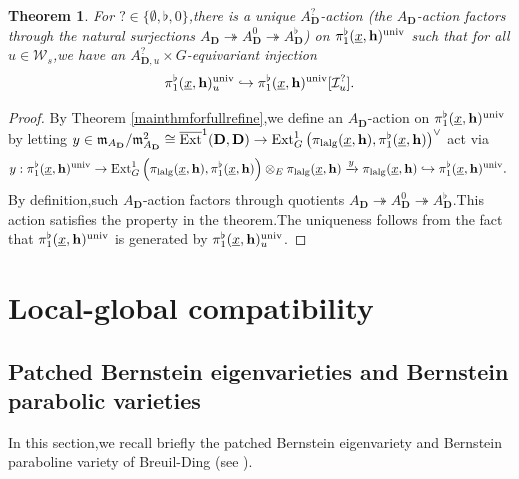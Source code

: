 \documentclass[10pt]{article}
\newtheorem{thm}{Theorem}[section]
\newcommand{\ext}{{\rm Ext}}
\newcommand{\lalg}{{\rm lalg}}
\newcommand{\Dpik}{{\mathbf{D}}}
\newcommand{\univ}{{\rm univ}}
\newcommand{\bh}{{\mathbf{h}}}
\newcommand{\cI}{\mathcal I}
\newcommand{\fm}{{\mathfrak{m}}}
\newcommand{\sW}{\mathscr W}
\begin{document}
\begin{thm}\label{actionADonuniversal}
For $?\in\{\emptyset,\flat,0\}$,\;there is a unique $A^{?}_{\Dpik}$-action (the $A_{\Dpik}$-action factors through the natural surjections $A_{\Dpik}\twoheadrightarrow  A^0_{\Dpik}\twoheadrightarrow  A^{\flat}_{\Dpik}$) on $\pi^{\flat}_{1}(\underline{x},\bh)^{\univ}$ such that for all $u\in \sW_s$,\;we have an $A^{?}_{\Dpik,u}\times G$-equivariant injection
	\[\pi^{\flat}_{1}(\underline{x},\bh)_u^{\univ}\hookrightarrow \pi^{\flat}_{1}(\underline{x},\bh)^{\univ}[\cI^{?
	}_u].\]
\end{thm}
\begin{proof}
	By Theorem \ref{mainthmforfullrefine},\;we define an $A_{\Dpik}$-action on $\pi^{\flat}_{1}(\underline{x},\bh)^{\univ}$ by letting $y\in \fm_{A_{\Dpik}}/\fm^2_{A_{\Dpik}}\cong \overline{\ext}^1(\Dpik,\Dpik)\rightarrow \ext^1_{G}\left(\pi_{\lalg}(\underline{x},\bh),\pi^{\flat}_1(\underline{x},\bh)\right)^{\vee}$ act via
	\[y:\pi^{\flat}_{1}(\underline{x},\bh)^{\univ}\rightarrow \ext^1_{G}\left(\pi_{\lalg}(\underline{x},\bh),\pi^{\flat}_1(\underline{x},\bh)\right)\otimes_E\pi_{\lalg}(\underline{x},\bh)\xrightarrow{y} \pi_{\lalg}(\underline{x},\bh)\hookrightarrow \pi^{\flat}_{1}(\underline{x},\bh)^{\univ}.\;\]
By definition,\;such $A_{\Dpik}$-action factors through quotients $A_{\Dpik}\twoheadrightarrow  A^0_{\Dpik}\twoheadrightarrow  A^{\flat}_{\Dpik}$.\;This action satisfies the property in the theorem.\;The uniqueness follows from the fact that $\pi^{\flat}_{1}(\underline{x},\bh)^{\univ}$ is generated by $\pi^{\flat}_{1}(\underline{x},\bh)_u^{\univ}$.\;
\end{proof}



\section{Local-global compatibility}




\subsection{Patched Bernstein eigenvarieties and Bernstein parabolic varieties}\label{BENVARPARAVAR}

In this section,\;we recall briefly  the patched Bernstein eigenvariety  and Bernstein paraboline variety  of Breuil-Ding (see \cite[Section 3.3,\;Section 4.2]{Ding2021}).\;
\end{document}

